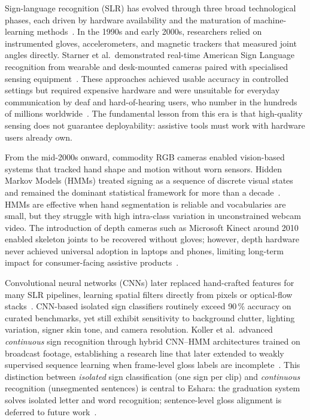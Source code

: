 \noindent Sign-language recognition (SLR) has evolved through three broad technological phases, each driven by hardware availability and the maturation of machine-learning methods~\cite{rastgoo2021survey,sterpu2018sign,adaloglou2022comprehensive}. In the 1990s and early 2000s, researchers relied on instrumented gloves, accelerometers, and magnetic trackers that measured joint angles directly. Starner et al.\ demonstrated real-time American Sign Language recognition from wearable and desk-mounted cameras paired with specialised sensing equipment~\cite{starner1998realtime}. These approaches achieved usable accuracy in controlled settings but required expensive hardware and were unsuitable for everyday communication by deaf and hard-of-hearing users, who number in the hundreds of millions worldwide~\cite{who2024hearing}. The fundamental lesson from this era is that high-quality sensing does not guarantee deployability: assistive tools must work with hardware users already own.\par\vspace{0.2cm}

\noindent From the mid-2000s onward, commodity RGB cameras enabled vision-based systems that tracked hand shape and motion without worn sensors. Hidden Markov Models (HMMs) treated signing as a sequence of discrete visual states and remained the dominant statistical framework for more than a decade~\cite{rabiner1989tutorial,koller2015continuous,koller2016continuous}. HMMs are effective when hand segmentation is reliable and vocabularies are small, but they struggle with high intra-class variation in unconstrained webcam video. The introduction of depth cameras such as Microsoft Kinect around 2010 enabled skeleton joints to be recovered without gloves; however, depth hardware never achieved universal adoption in laptops and phones, limiting long-term impact for consumer-facing assistive products~\cite{rastgoo2021survey}.\par\vspace{0.2cm}

\noindent Convolutional neural networks (CNNs) later replaced hand-crafted features for many SLR pipelines, learning spatial filters directly from pixels or optical-flow stacks~\cite{he2016deep,koller2016continuous,pigou2018sign}. CNN-based isolated sign classifiers routinely exceed 90\,\% accuracy on curated benchmarks, yet still exhibit sensitivity to background clutter, lighting variation, signer skin tone, and camera resolution. Koller et al.\ advanced \emph{continuous} sign recognition through hybrid CNN--HMM architectures trained on broadcast footage, establishing a research line that later extended to weakly supervised sequence learning when frame-level gloss labels are incomplete~\cite{koller2020weakly}. This distinction between \emph{isolated} sign classification (one sign per clip) and \emph{continuous} recognition (unsegmented sentences) is central to Eshara: the graduation system solves isolated letter and word recognition; sentence-level gloss alignment is deferred to future work~\cite{duarte2021how2sign,forster2014rwth}.\par\vspace{0.2cm}

